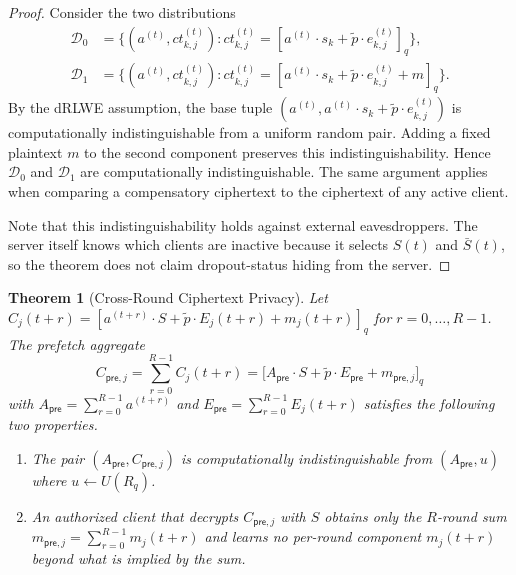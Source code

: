 \documentclass[10pt]{article}
\newtheorem{theorem}{Theorem}
\begin{document}
\begin{proof}
Consider the two distributions
\begin{align*}
\mathcal{D}_0 &= \{(a^{(t)},ct_{k,j}^{(t)}):ct_{k,j}^{(t)}=[a^{(t)}\cdot s_k+\tilde{p}\cdot e_{k,j}^{(t)}]_q\},\\
\mathcal{D}_1 &= \{(a^{(t)},ct_{k,j}^{(t)}):ct_{k,j}^{(t)}=[a^{(t)}\cdot s_k+\tilde{p}\cdot e_{k,j}^{(t)}+m]_q\}.
\end{align*}
By the dRLWE assumption, the base tuple $(a^{(t)},a^{(t)}\cdot s_k+\tilde{p}\cdot e_{k,j}^{(t)})$ is computationally indistinguishable from a uniform random pair. Adding a fixed plaintext $m$ to the second component preserves this indistinguishability. Hence $\mathcal{D}_0$ and $\mathcal{D}_1$ are computationally indistinguishable. The same argument applies when comparing a compensatory ciphertext to the ciphertext of any active client.

Note that this indistinguishability holds against external eavesdroppers. The server itself knows which clients are inactive because it selects $S(t)$ and $\bar{S}(t)$, so the theorem does not claim dropout-status hiding from the server.
\end{proof}

\begin{theorem}[Cross-Round Ciphertext Privacy]
Let $C_j(t+r)=[a^{(t+r)}\cdot S+\tilde{p}\cdot E_j(t+r)+m_j(t+r)]_q$ for $r=0,\dots,R-1$. The prefetch aggregate
\[
C_{\mathsf{pre},j}=\sum_{r=0}^{R-1}C_j(t+r)=\bigl[A_{\mathsf{pre}}\cdot S+\tilde{p}\cdot E_{\mathsf{pre}}+m_{\mathsf{pre},j}\bigr]_q
\]
with $A_{\mathsf{pre}}=\sum_{r=0}^{R-1}a^{(t+r)}$ and $E_{\mathsf{pre}}=\sum_{r=0}^{R-1}E_j(t+r)$ satisfies the following two properties.
\begin{enumerate}
    \item[(i)] The pair $(A_{\mathsf{pre}},C_{\mathsf{pre},j})$ is computationally indistinguishable from $(A_{\mathsf{pre}},u)$ where $u\leftarrow U(R_q)$.
    \item[(ii)] An authorized client that decrypts $C_{\mathsf{pre},j}$ with $S$ obtains only the $R$-round sum $m_{\mathsf{pre},j}=\sum_{r=0}^{R-1}m_j(t+r)$ and learns no per-round component $m_j(t+r)$ beyond what is implied by the sum.
\end{enumerate}
\end{theorem}
\end{document}
